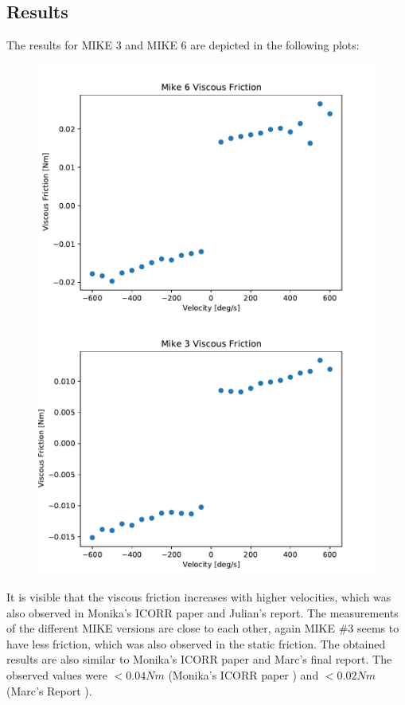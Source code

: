 \subsection{Results}

The results for MIKE 3 and MIKE 6 are depicted in the following plots:

\begin{figure}[h]
    \begin{minipage}[m]{0.48\textwidth}
     \centering
        \includegraphics[width = \textwidth]{chapters/dynamic friction/Mike6_DynamicFriction.pdf}
    \end{minipage}
    \hfill
    \begin{minipage}[m]{0.48\textwidth}
     \centering
        \includegraphics[width = \textwidth]{chapters/dynamic friction/Mike3_DynamicFriction.pdf}
    \end{minipage}
\end{figure}

It is visible that the viscous friction increases with higher velocities, which was also observed in Monika's ICORR paper and Julian's report. The measurements of the different MIKE versions are close to each other, again MIKE \#3 seems to have less friction, which was also observed in the static friction. The obtained results are also similar to Monika's ICORR paper and Marc's final report. The observed values were $<0.04Nm$ (Monika's ICORR paper \cite{icorr}) and $<0.02Nm$ (Marc's Report \cite{marc}).